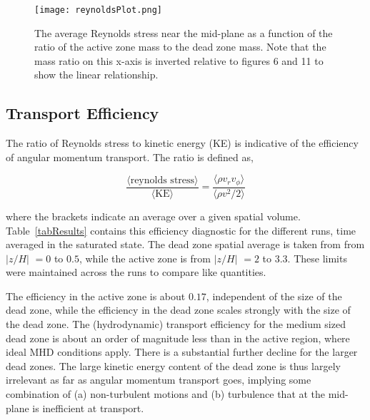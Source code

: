 \begin{figure}[p]
\centering
\texttt{[image: reynoldsPlot.png]}
\caption{The average Reynolds stress near the mid-plane as a function of the ratio of the active zone mass to the dead zone mass.  Note that the mass ratio on this x-axis is inverted relative to figures 6 and 11 to show the linear relationship.  }
\label{figReynoldsPlot}
\end{figure}


\subsection{Transport Efficiency}
The ratio of Reynolds stress to kinetic energy (KE) is indicative of the efficiency of angular momentum transport.  
The ratio is defined as,

\begin{equation}
\frac{\langle \text{reynolds stress} \rangle}{\langle \text{KE} \rangle} = \frac{\langle \rho v_r  v_\phi \rangle}{\langle \rho v^2 /2 \rangle}                      
\end{equation}

\noindent where the brackets indicate an average over a given spatial volume.  Table~\ref{tabResults} contains this efficiency diagnostic for the different runs, time averaged in the saturated state. The dead zone spatial average is taken from from $|z/H|$ $= 0$ to $0.5$, while the active zone is from $|z/H|$ $=2$ to $3.3$.  These limits were maintained across the runs to compare like quantities.

The efficiency in the active zone is about $0.17$, independent of the size of the dead zone, while the efficiency in the dead zone scales strongly with the size of the dead zone.  The (hydrodynamic) transport efficiency for the medium sized dead zone is about an order of magnitude less than in the active region, where ideal MHD conditions apply. There is a substantial further decline for the larger dead zones. The large kinetic energy content of the dead zone is thus largely irrelevant as far as angular momentum transport goes, implying some combination of (a) non-turbulent motions and (b) turbulence that at the mid-plane is inefficient at transport.

